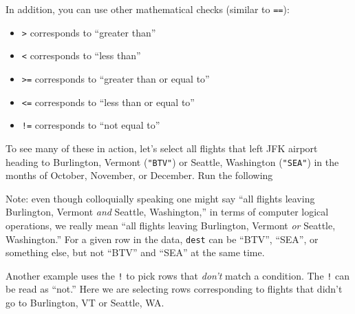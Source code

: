 \documentclass[12pt,]{krantz}
\makeatletter
\newenvironment{Shaded}{\begin{snugshade}}{\end{snugshade}}
\newcommand{\KeywordTok}[1]{\textcolor[rgb]{0.27,0.27,0.27}{\textbf{#1}}}
\newcommand{\DecValTok}[1]{\textcolor[rgb]{0.06,0.06,0.06}{#1}}
\newcommand{\StringTok}[1]{\textcolor[rgb]{0.5,0.5,0.5}{#1}}
\newcommand{\OperatorTok}[1]{\textcolor[rgb]{0.43,0.43,0.43}{\textbf{#1}}}
\newcommand{\NormalTok}[1]{#1}
\providecommand{\tightlist}{%
  \setlength{\itemsep}{0pt}\setlength{\parskip}{0pt}}
\newenvironment{kframe}{%
\medskip{}
\setlength{\fboxsep}{.8em}
 \def\at@end@of@kframe{}%
 \ifinner\ifhmode%
  \def\at@end@of@kframe{\end{minipage}}%
  \begin{minipage}{\columnwidth}%
 \fi\fi%
 \def\FrameCommand##1{\hskip\@totalleftmargin \hskip-\fboxsep
 \colorbox{shadecolor}{##1}\hskip-\fboxsep
     \hskip-\linewidth \hskip-\@totalleftmargin \hskip\columnwidth}%
 \MakeFramed {\advance\hsize-\width
   \@totalleftmargin\z@ \linewidth\hsize
   \@setminipage}}%
 {\par\unskip\endMakeFramed%
 \at@end@of@kframe}
\renewenvironment{Shaded}{\begin{kframe}}{\end{kframe}}
\makeatother
\begin{document}
In addition, you can use other mathematical checks (similar to
\texttt{==}):

\begin{itemize}
\tightlist
\item
  \texttt{\textgreater{}} corresponds to ``greater than''
\item
  \texttt{\textless{}} corresponds to ``less than''
\item
  \texttt{\textgreater{}=} corresponds to ``greater than or equal to''
\item
  \texttt{\textless{}=} corresponds to ``less than or equal to''
\item
  \texttt{!=} corresponds to ``not equal to''
\end{itemize}

To see many of these in action, let's select all flights that left JFK
airport heading to Burlington, Vermont (\texttt{"BTV"}) or Seattle,
Washington (\texttt{"SEA"}) in the months of October, November, or
December. Run the following

\begin{Shaded}
\end{Shaded}

Note: even though colloquially speaking one might say ``all flights
leaving Burlington, Vermont \emph{and} Seattle, Washington,'' in terms
of computer logical operations, we really mean ``all flights leaving
Burlington, Vermont \emph{or} Seattle, Washington.'' For a given row in
the data, \texttt{dest} can be ``BTV'', ``SEA'', or something else, but
not ``BTV'' and ``SEA'' at the same time.

Another example uses the \texttt{!} to pick rows that \emph{don't} match
a condition. The \texttt{!} can be read as ``not.'' Here we are
selecting rows corresponding to flights that didn't go to Burlington, VT
or Seattle, WA.

\begin{Shaded}
\end{Shaded}
\end{document}
